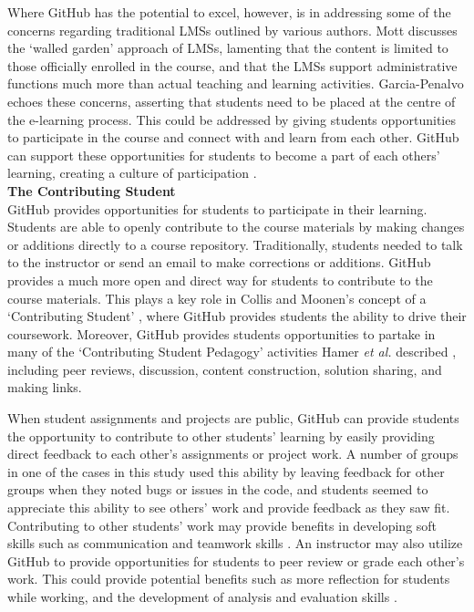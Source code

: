 Where GitHub has the potential to excel, however, is in addressing some of the concerns regarding traditional LMSs outlined by various authors. Mott \cite{mott2010envisioning} discusses the `walled garden' approach of LMSs, lamenting that the content is limited to those officially enrolled in the course, and that the LMSs support administrative functions much more than actual teaching and learning activities. Garcia-Penalvo \cite{garcia2011opening} echoes these concerns, asserting that students need to be placed at the centre of the e-learning process. This could be addressed by giving students opportunities to participate in the course and connect with and learn from each other. GitHub can support these opportunities for students to become a part of each others' learning, creating a culture of participation \cite{jenkins2009confronting}. \\

\textbf{The Contributing Student} \\
GitHub provides opportunities for students to participate in their learning. Students are able to openly contribute to the course materials by making changes or additions directly to a course repository. Traditionally, students needed to talk to the instructor or send an email to make corrections or additions. GitHub provides a much more open and direct way for students to contribute to the course materials. This plays a key role in Collis and Moonen's concept of a `Contributing Student' \cite{collis2006contributing}, where GitHub provides students the ability to drive their coursework. Moreover, GitHub provides students opportunities to partake in many of the `Contributing Student Pedagogy' activities Hamer \textit{et al.} described \cite{hamer2011tools}, including peer reviews, discussion, content construction, solution sharing, and making links.

When student assignments and projects are public, GitHub can provide students the opportunity to contribute to other students' learning by easily providing direct feedback to each other's assignments or project work. A number of groups in one of the cases in this study used this ability by leaving feedback for other groups when they noted bugs or issues in the code, and students seemed to appreciate this ability to see others' work and provide feedback as they saw fit. Contributing to other students' work may provide benefits in developing soft skills such as communication and teamwork skills \cite{hamer2006some}. An instructor may also utilize GitHub to provide opportunities for students to peer review or grade each other's work. This could provide potential benefits such as more reflection for students while working, and the development of analysis and evaluation skills \cite{sondergaard2012collaborative}.

